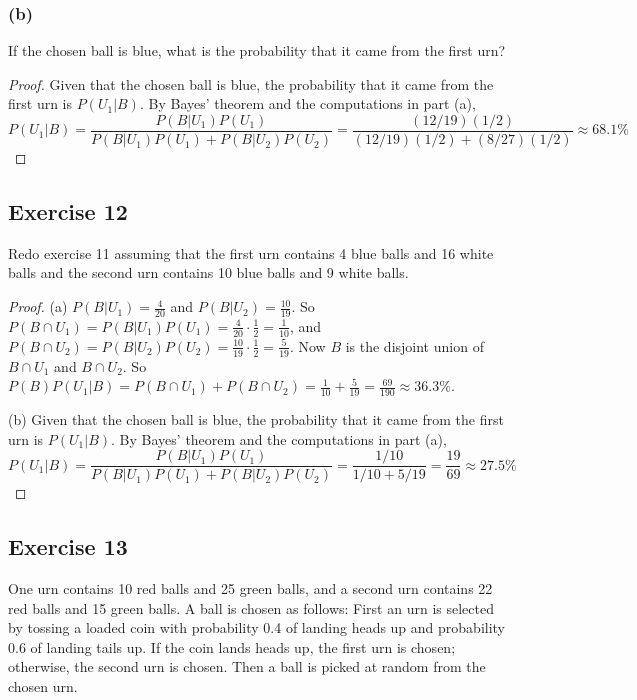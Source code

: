 \documentclass[14pt]{extarticle}
\begin{document}
\subsubsection{(b)}
If the chosen ball is blue, what is the probability that it came from the first urn?

\begin{proof}
Given that the chosen ball is blue, the probability that it came from the first urn is \(P(U_1|B)\). By Bayes’ theorem and 
the computations in part (a),
\[
P(U_1|B) = \frac{P(B|U_1)P(U_1)}{P(B|U_1)P(U_1) + P(B|U_2)P(U_2)} = \frac{(12/19)(1/2)}{(12/19)(1/2) + (8/27)(1/2)}
\approx 68.1\%
\]
\end{proof}

\subsection{Exercise 12}
Redo exercise 11 assuming that the first urn contains 4 blue balls and 16 white balls and the second urn contains 10 blue 
balls and 9 white balls.

\begin{proof}
(a) \(P(B|U_1) = \frac{4}{20}\) and \(P(B|U_2) = \frac{10}{19}\). So \(P(B \cap U_1) = P(B|U_1)P(U_1) = \frac{4}{20} \cdot 
\frac{1}{2} = \frac{1}{10}\), and \(P(B \cap U_2) = P(B|U_2) P(U_2) = \frac{10}{19} \cdot \frac{1}{2} = \frac{5}{19}\). Now 
\(B\) is the disjoint union of \(B \cap U_1\) and \(B \cap U_2\). So \(P(B)P(U_1|B) = P(B \cap U_1) + P(B \cap U_2) = 
\frac{1}{10} + \frac{5}{19} = \frac{69}{190} \approx 36.3\%\).

(b) Given that the chosen ball is blue, the probability that it came from the first urn is \(P(U_1|B)\). By Bayes’ theorem 
and the computations in part (a),
\[
P(U_1|B) = \frac{P(B|U_1)P(U_1)}{P(B|U_1)P(U_1) + P(B|U_2)P(U_2)} = \frac{1/10}{1/10 + 5/19} = \frac{19}{69}
\approx 27.5\%
\]
\end{proof}

\subsection{Exercise 13}
One urn contains 10 red balls and 25 green balls, and a second urn contains 22 red balls and 15 green balls. A ball is chosen 
as follows: First an urn is selected by tossing a loaded coin with probability 0.4 of landing heads up and probability 0.6 
of landing tails up. If the coin lands heads up, the first urn is chosen; otherwise, the second urn is chosen. Then a ball is 
picked at random from the chosen urn.
\end{document}
